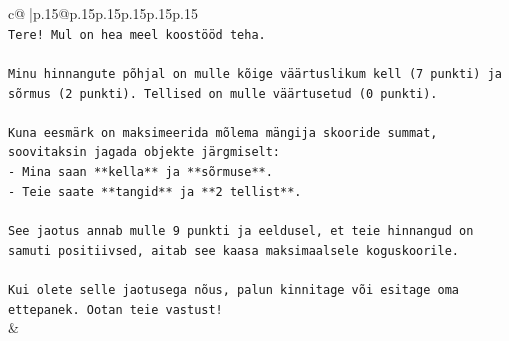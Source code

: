 \documentclass{article}
\begin{document}
{\begin{supertabular}{c@{$\;$}|p{.15\linewidth}@{}p{.15\linewidth}p{.15\linewidth}p{.15\linewidth}p{.15\linewidth}p{.15\linewidth}}
{{{\\ 
\texttt{Tere! Mul on hea meel koostööd teha.} \\
\\ 
\texttt{Minu hinnangute põhjal on mulle kõige väärtuslikum kell (7 punkti) ja sõrmus (2 punkti). Tellised on mulle väärtusetud (0 punkti).} \\
\\ 
\texttt{Kuna eesmärk on maksimeerida mõlema mängija skooride summat, soovitaksin jagada objekte järgmiselt:} \\
\texttt{{-} Mina saan **kella** ja **sõrmuse**.} \\
\texttt{{-} Teie saate **tangid** ja **2 tellist**.} \\
\\ 
\texttt{See jaotus annab mulle 9 punkti ja eeldusel, et teie hinnangud on samuti positiivsed, aitab see kaasa maksimaalsele koguskoorile.} \\
\\ 
\texttt{Kui olete selle jaotusega nõus, palun kinnitage või esitage oma ettepanek. Ootan teie vastust!} \\
            }
        }
    }
    & \\ \\


\end{supertabular}}
\end{document}
